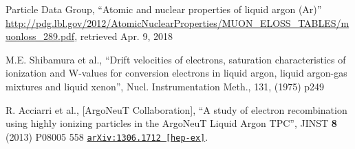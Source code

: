 \documentclass[a4paper]{article}
\begin{document}
\begin{thebibliography}{99}
 Particle Data Group, ``Atomic and nuclear properties of liquid argon (Ar)'' \url{http://pdg.lbl.gov/2012/AtomicNuclearProperties/MUON_ELOSS_TABLES/muonloss_289.pdf}, retrieved Apr. 9, 2018

 M.E. Shibamura et al., ``Drift velocities of electrons, saturation characteristics of ionization and W-values for conversion electrons in liquid argon, liquid argon-gas mixtures and liquid xenon'', Nucl. Instrumentation Meth., 131, (1975) p249

 R. Acciarri et al., [ArgoNeuT Collaboration], ``A study of electron recombination using highly ionizing particles in the ArgoNeuT Liquid Argon TPC'', JINST {\bf 8} (2013) P08005
558 \href{https://arxiv.org/abs/1306.1712}{\texttt{arXiv:1306.1712 [hep-ex]}}.

\end{thebibliography}



% 
% 
\end{document}
